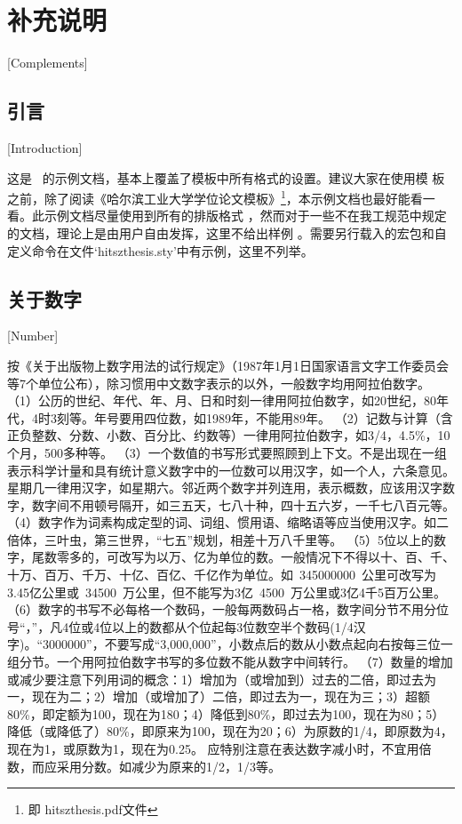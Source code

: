 
\chapter{补充说明}[Complements]

\section{引言}[Introduction]

这是 \hitszthesis\ 的示例文档，基本上覆盖了模板中所有格式的设置。建议大家在使用模
板之前，除了阅读《\hitszthesis\:哈尔滨工业大学学位论文模板》\footnote{即
hitszthesis.pdf文件}，本示例文档也最好能看一看。此示例文档尽量使用到所有的排版格式
，然而对于一些不在我工规范中规定的文档，理论上是由用户自由发挥，这里不给出样例
。需要另行载入的宏包和自定义命令在文件`hitszthesis.sty'中有示例，这里不列举。

\section{关于数字}[Number]

按《关于出版物上数字用法的试行规定》（1987年1月1日国家语言文字工作委员会等7个单位公布），除习惯用中文数字表示的以外，一般数字均用阿拉伯数字。
（1）公历的世纪、年代、年、月、日和时刻一律用阿拉伯数字，如20世纪，80年代，4时3刻等。年号要用四位数，如1989年，不能用89年。
（2）记数与计算（含正负整数、分数、小数、百分比、约数等）一律用阿拉伯数字，如3/4，4.5\%，10个月，500多种等。
（3）一个数值的书写形式要照顾到上下文。不是出现在一组表示科学计量和具有统计意义数字中的一位数可以用汉字，如一个人，六条意见。星期几一律用汉字，如星期六。邻近两个数字并列连用，表示概数，应该用汉字数字，数字间不用顿号隔开，如三五天，七八十种，四十五六岁，一千七八百元等。
（4）数字作为词素构成定型的词、词组、惯用语、缩略语等应当使用汉字。如二倍体，三叶虫，第三世界，“七五”规划，相差十万八千里等。
（5）5位以上的数字，尾数零多的，可改写为以万、亿为单位的数。一般情况下不得以十、百、千、十万、百万、千万、十亿、百亿、千亿作为单位。如~\num{345000000}~公里可改写为3.45亿公里或~\num{34500}~万公里，但不能写为3亿~\num{4500}~万公里或3亿4千5百万公里。
（6）数字的书写不必每格一个数码，一般每两数码占一格，数字间分节不用分位号“，”，凡4位或4位以上的数都从个位起每3位数空半个数码(1/4汉字)。“\num{3000000}”，不要写成“3,000,000”，小数点后的数从小数点起向右按每三位一组分节。一个用阿拉伯数字书写的多位数不能从数字中间转行。
（7）数量的增加或减少要注意下列用词的概念：1）增加为（或增加到）过去的二倍，即过去为一，现在为二；2）增加（或增加了）二倍，即过去为一，现在为三；3）超额80\%，即定额为100，现在为180；4）降低到80\%，即过去为100，现在为80；5）降低（或降低了）80\%，即原来为100，现在为20；6）为原数的1/4，即原数为4，现在为1，或原数为1，现在为0.25。
应特别注意在表达数字减小时，不宜用倍数，而应采用分数。如减少为原来的1/2，1/3等。

